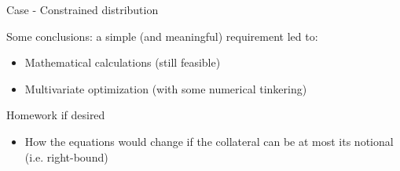 \documentclass[presentation]{beamer}
\begin{document}
\begin{frame}[label=sec-4-4]{Case - Constrained distribution}
\begin{block}{Some conclusions: a simple (and meaningful) requirement led to:}
\begin{itemize}
\item Mathematical calculations (still feasible)
\item Multivariate optimization (with some numerical tinkering)
\end{itemize}
\end{block}
\begin{block}{Homework if desired}
\begin{itemize}
\item How the equations would change if the collateral can be at most its notional (i.e. right-bound)
\end{itemize}
\end{block}
\end{frame}
\end{document}
